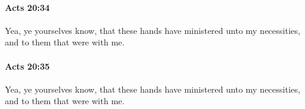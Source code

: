 		\paragraph{Acts 20:34} %
			\label{ACTS-20-34}

			Yea, ye yourselves know, that these hands have ministered unto my necessities, and to them that were with me.

			\begin{framed}
			\scriptsize
				\begin{compactdesc}
					\item[SBLG] 
				\end{compactdesc}
			\end{framed}

		\paragraph{Acts 20:35} %
			\label{ACTS-20-35}

			Yea, ye yourselves know, that these hands have ministered unto my necessities, and to them that were with me.

